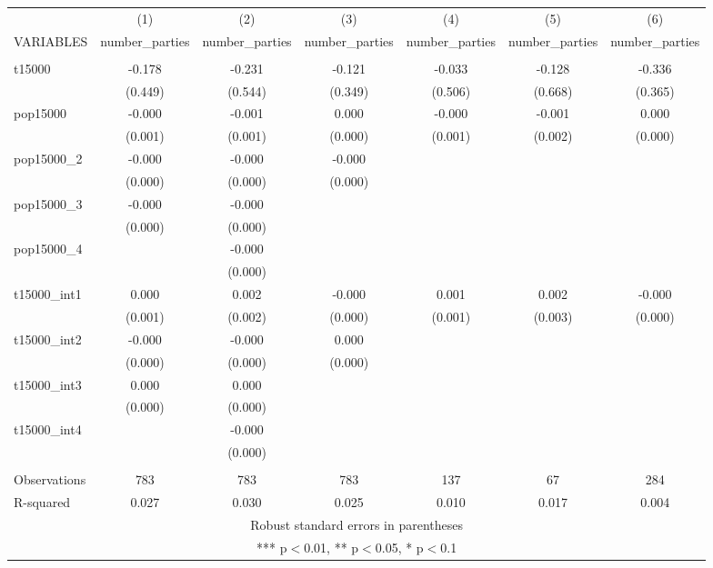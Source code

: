 \documentclass[]{article}
\begin{document}
\begin{tabular}{lcccccc} \hline
 & (1) & (2) & (3) & (4) & (5) & (6) \\
VARIABLES & number\_parties & number\_parties & number\_parties & number\_parties & number\_parties & number\_parties \\ \hline
 &  &  &  &  &  &  \\
t15000 & -0.178 & -0.231 & -0.121 & -0.033 & -0.128 & -0.336 \\
 & (0.449) & (0.544) & (0.349) & (0.506) & (0.668) & (0.365) \\
pop15000 & -0.000 & -0.001 & 0.000 & -0.000 & -0.001 & 0.000 \\
 & (0.001) & (0.001) & (0.000) & (0.001) & (0.002) & (0.000) \\
pop15000\_2 & -0.000 & -0.000 & -0.000 &  &  &  \\
 & (0.000) & (0.000) & (0.000) &  &  &  \\
pop15000\_3 & -0.000 & -0.000 &  &  &  &  \\
 & (0.000) & (0.000) &  &  &  &  \\
pop15000\_4 &  & -0.000 &  &  &  &  \\
 &  & (0.000) &  &  &  &  \\
t15000\_int1 & 0.000 & 0.002 & -0.000 & 0.001 & 0.002 & -0.000 \\
 & (0.001) & (0.002) & (0.000) & (0.001) & (0.003) & (0.000) \\
t15000\_int2 & -0.000 & -0.000 & 0.000 &  &  &  \\
 & (0.000) & (0.000) & (0.000) &  &  &  \\
t15000\_int3 & 0.000 & 0.000 &  &  &  &  \\
 & (0.000) & (0.000) &  &  &  &  \\
t15000\_int4 &  & -0.000 &  &  &  &  \\
 &  & (0.000) &  &  &  &  \\
 &  &  &  &  &  &  \\
Observations & 783 & 783 & 783 & 137 & 67 & 284 \\
 R-squared & 0.027 & 0.030 & 0.025 & 0.010 & 0.017 & 0.004 \\ \hline
\multicolumn{7}{c}{ Robust standard errors in parentheses} \\
\multicolumn{7}{c}{ *** p$<$0.01, ** p$<$0.05, * p$<$0.1} \\
\end{tabular}
\end{document}
